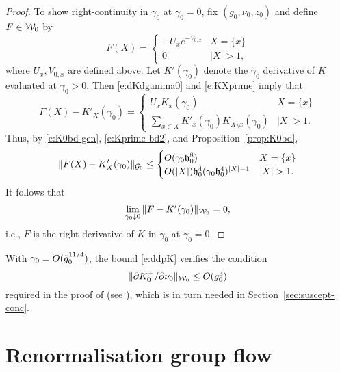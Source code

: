 \begin{proof}
To show right-continuity in $\gamma_0$ at $\gamma_0 = 0$,
fix $(g_0, \nu_0, z_0)$ and define $F \in \mathcal{W}_0$ by
\begin{equation}
F(X) =
\begin{cases}
  -U_x e^{-V_{0,x}}
    & X = \{ x \} \\
  0 & |X| > 1,
\end{cases}
\end{equation}
where $U_x, V_{0,x}$ are defined above.
Let $K'(\gamma_0)$ denote the $\gamma_0$ derivative of $K$ evaluated at $\gamma_0 > 0$.  Then
\eqref{e:dKdgamma0} and \eqref{e:KXprime} imply that
\begin{equation}
F(X) - K'_X(\gamma_0)
  =
\begin{cases}
  U_x K_x(\gamma_0)
    & X = \{ x \} \\
  \sum_{x \in X} K'_x(\gamma_0) K_{X \setminus x}(\gamma_0)
    & |X| > 1.
\end{cases}
\end{equation}
Thus, by \eqref{e:K0bd-gen}, \eqref{e:Kprime-bd2}, and Proposition~\ref{prop:K0bd},
\begin{equation}
\|F(X) - K'_X(\gamma_0)\|_{\mathcal{G}_0}
  \le
\begin{cases}
  O(\gamma_0 \mathfrak{h}_0^8)
    & X = \{ x \} \\
  O(|X|) \mathfrak{h}_0^4 (\gamma_0 \mathfrak{h}_0^4)^{|X|-1}
    & |X| > 1.
\end{cases}
\end{equation}
It follows that
\begin{equation}
\lim_{\gamma_0\downarrow 0} \|F - K'(\gamma_0)\|_{\mathcal{W}_0} = 0,
\end{equation}
i.e., $F$ is the right-derivative of $K$ in $\gamma_0$ at $\gamma_0 = 0$.
\end{proof}

\begin{rk}
\label{rk:DK-base-case}
With $\gamma_0 = O(\tilde{g}_0^{11/4})$, the bound \eqref{e:ddpK} verifies the condition
\begin{equation}
\|\partial K^+_0/\partial\nu_0\|_{\mathcal{W}_0} \le O(g_0^3)
\end{equation}
required in the proof of \cite[Lemma~\ref{log-lem:gzmuprime}]{BBS-saw4-log}
(see \cite[\eqref{log-e:induct1}]{BBS-saw4-log}),
which is in turn needed in Section~\ref{sec:suscept-conc}.
\end{rk}

\section{Renormalisation group flow}
\label{sec:flow}

